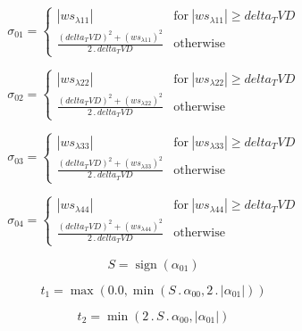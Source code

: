 \documentclass{article}
\begin{document}
\begin{dmath}\sigma_{0 1} = \begin{cases} \left|{ws_{\lambda 11}}\right| & \text{for}\: \left|{ws_{\lambda 11}}\right| \geq delta_TVD \\\frac{\left(delta_TVD \right)^{2} + \left(ws_{\lambda 11} \right)^{2}}{2 \,.\, delta_TVD} & \text{otherwise} 
\end{cases}\end{dmath}

\begin{dmath}\sigma_{0 2} = \begin{cases} \left|{ws_{\lambda 22}}\right| & \text{for}\: \left|{ws_{\lambda 22}}\right| \geq delta_TVD \\\frac{\left(delta_TVD \right)^{2} + \left(ws_{\lambda 22} \right)^{2}}{2 \,.\, delta_TVD} & \text{otherwise} 
\end{cases}\end{dmath}

\begin{dmath}\sigma_{0 3} = \begin{cases} \left|{ws_{\lambda 33}}\right| & \text{for}\: \left|{ws_{\lambda 33}}\right| \geq delta_TVD \\\frac{\left(delta_TVD \right)^{2} + \left(ws_{\lambda 33} \right)^{2}}{2 \,.\, delta_TVD} & \text{otherwise} 
\end{cases}\end{dmath}

\begin{dmath}\sigma_{0 4} = \begin{cases} \left|{ws_{\lambda 44}}\right| & \text{for}\: \left|{ws_{\lambda 44}}\right| \geq delta_TVD \\\frac{\left(delta_TVD \right)^{2} + \left(ws_{\lambda 44} \right)^{2}}{2 \,.\, delta_TVD} & \text{otherwise} 
\end{cases}\end{dmath}

\begin{dmath}S = \operatorname{sign}{\left (\alpha_{01} \right )}\end{dmath}

\begin{dmath}t_{1} = \max\left(0.0, \min\left(S \,.\, \alpha_{00}, 2 \,.\, \left|{\alpha_{01}}\right|\right)\right)\end{dmath}

\begin{dmath}t_{2} = \min\left(2 \,.\, S \,.\, \alpha_{00}, \left|{\alpha_{01}}\right|\right)\end{dmath}
\end{document}
